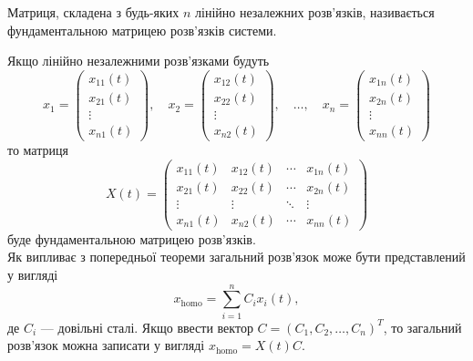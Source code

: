 \begin{definition}
	Матриця, складена з будь-яких $n$ лінійно незалежних роз\-в'яз\-ків, називається фундаментальною матрицею розв'язків системи.
\end{definition}

Якщо лінійно незалежними розв'язками будуть \[ x_1 = \begin{pmatrix} x_{11}(t) \\ x_{21}(t) \\ \vdots \\ x_{n1}(t) \end{pmatrix}, \quad x_2 = \begin{pmatrix} x_{12}(t) \\ x_{22}(t) \\ \vdots \\ x_{n2}(t) \end{pmatrix}, \quad \ldots, \quad x_n = \begin{pmatrix} x_{1n}(t) \\ x_{2n}(t) \\ \vdots \\ x_{nn}(t) \end{pmatrix} \] то матриця
\begin{equation*}
	X(t) = \begin{pmatrix} x_{11} (t) & x_{12} (t) & \cdots & x_{1n} (t) \\ x_{21} (t) & x_{22} (t) & \cdots & x_{2n} (t) \\ \vdots & \vdots & \ddots & \vdots \\ x_{n1} (t) & x_{n2} (t) & \cdots & x_{nn} (t) \end{pmatrix}
\end{equation*}
буде фундаментальною матрицею розв'язків. \\

Як випливає з попередньої теореми загальний розв'язок може бути представлений у вигляді
\begin{equation*}
	x_{\text{homo}} = \sum_{i = 1}^n C_i x_i(t),
\end{equation*}
де $C_i$ --- довільні сталі. Якщо ввести вектор $C = (C_1, C_2, \ldots, C_n)^T$, то загальний розв'язок можна записати у вигляді $x_{\text{homo}} = X(t) C$.
